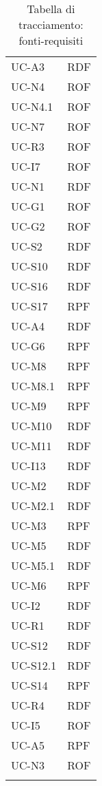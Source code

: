 \begin{longtable}{| p{5cm} | p{5cm} |}
		\rowcolor{LightGray}
		UC-A3 & RDF\\
		UC-N4 & ROF\\
		\rowcolor{LightGray}
		UC-N4.1 & ROF\\
		UC-N7 & ROF\\
		\rowcolor{LightGray}
		UC-R3 & ROF\\
		\rowcolor{LightGray}
		UC-I7 & ROF\\
		UC-N1 & RDF\\
		\rowcolor{LightGray}
		UC-G1 & ROF\\
		UC-G2 & ROF\\
		\rowcolor{LightGray}
		UC-S2 & RDF\\
		UC-S10 & RDF\\
		\rowcolor{LightGray}
		UC-S16 & RDF\\
		UC-S17 & RPF\\
		\rowcolor{LightGray}
		UC-A4 & RDF \\
		UC-G6 & RPF\\
		\rowcolor{LightGray}
		UC-M8 & RPF\\
		UC-M8.1 & RPF\\
		UC-M9 & RPF\\
		\rowcolor{LightGray}
		UC-M10 & RDF\\
		UC-M11 & RDF\\
		\rowcolor{LightGray}
		UC-I13 & RDF \\
		UC-M2 & RDF \\
		UC-M2.1 & RDF \\
		\rowcolor{LightGray}
		UC-M3 & RPF \\
		UC-M5 & RDF \\
		UC-M5.1 & RDF \\
		\rowcolor{LightGray}
		UC-M6 & RPF \\
		UC-I2 & RDF \\
		\rowcolor{LightGray}
		UC-R1 & RDF \\
		UC-S12 & RDF \\
		UC-S12.1 & RDF \\
		\rowcolor{LightGray}
		UC-S14 & RPF \\
		UC-R4 & RDF \\
		\rowcolor{LightGray}
		UC-I5 & ROF\\
		UC-A5 & RPF\\
		\rowcolor{LightGray}
		UC-N3 & ROF\\
		\hline
		\caption{Tabella di tracciamento: fonti-requisiti}
\end{longtable}
\newpage
